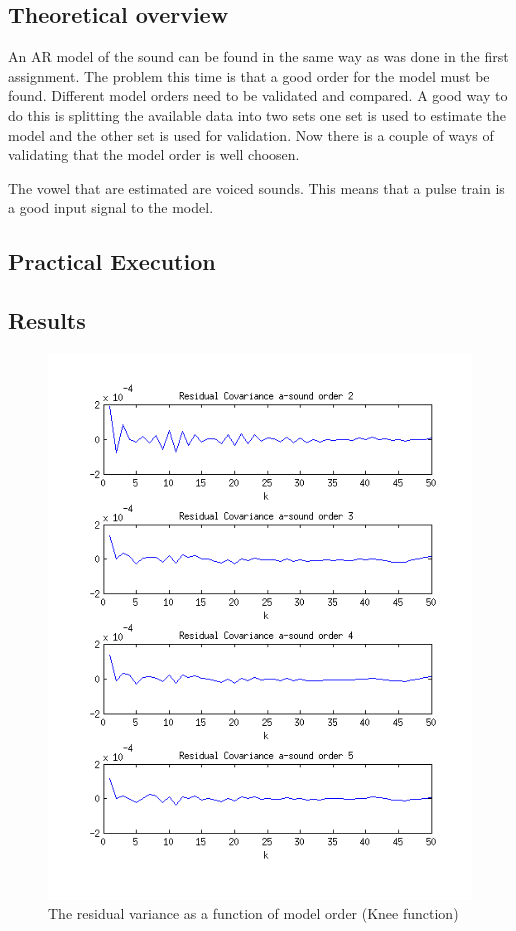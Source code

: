 \documentclass[12pt]{article}
\begin{document}
\subsection{Theoretical overview}
An AR model of the sound can be found in the same way as was done in the first assignment.
The problem this time is that a good order for the model must be found.
Different model orders need to be validated and compared.
A good way to do this is splitting the available data into two sets one set is used to estimate the model and the other set is used for validation.
Now there is a couple of ways of validating that the model order is well choosen.


The vowel that are estimated are voiced sounds.
This means that a pulse train is a good input signal to the model.

\subsection{Practical Execution}

\subsection{Results}

\begin{figure}[H]
\centering
\includegraphics[width=14cm]{residual_covariance_a.png}
\caption{The residual variance as a function of model order (Knee function)}
\end{figure}
\end{document}
